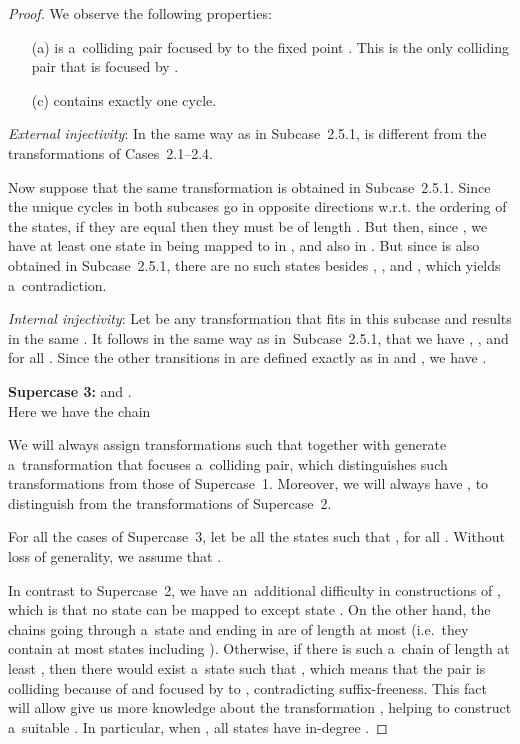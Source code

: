 \documentclass{amsart}
\begin{document}
\begin{proof}
We observe the following properties:
\begin{enumerate}
\item[(a)]  is a~colliding pair focused by  to the fixed point .
This is the only colliding pair that is focused by .

\item[(c)]  contains exactly one cycle.
\end{enumerate}

\textit{External injectivity}:
In the same way as in Subcase~2.5.1,  is different from the transformations of Cases~2.1--2.4.

Now suppose that the same transformation  is obtained in Subcase~2.5.1.
Since the unique cycles in both subcases go in opposite directions w.r.t. the ordering of the states, if they are equal then they must be of length .
But then, since , we have at least one state in  being mapped to  in , and also in .
But since  is also obtained in Subcase~2.5.1, there are no such states besides , , and , which yields a~contradiction.

\textit{Internal injectivity}:
Let  be any transformation that fits in this subcase and results in the same .
It follows in the same way as in~Subcase~2.5.1, that we have , , and  for all .
Since the other transitions in  are defined exactly as in  and , we have .

\textbf{Supercase 3:}  and .\\
Here we have the chain

We will always assign transformations  such that  together with  generate a~transformation that focuses a~colliding pair, which distinguishes such transformations  from those of Supercase~1.
Moreover, we will always have , to distinguish  from the transformations of Supercase~2.

For all the cases of Supercase~3, let  be all the states such that , for all .
Without loss of generality, we assume that .

In contrast to Supercase~2, we have an~additional difficulty in constructions of , which is that no state can be mapped to  except state .
On the other hand, the chains going through a~state  and ending in  are of length at most  (i.e.\ they contain at most  states including ).
Otherwise, if there is such a~chain of length at least , then there would exist a~state  such that , which means that the pair  is colliding because of  and focused by  to , contradicting suffix-freeness.
This fact will allow give us more knowledge about the transformation , helping to construct a~suitable .
In particular, when , all states  have in-degree .


\end{proof}
\end{document}

